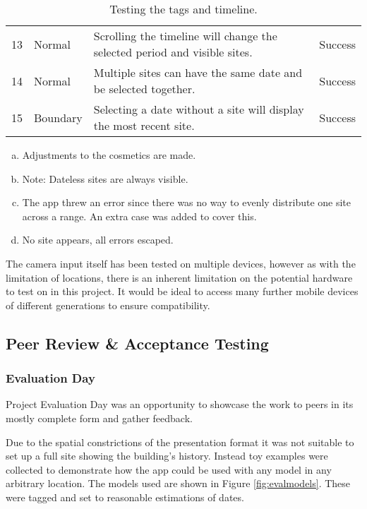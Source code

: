 \documentclass{article}
\begin{document}
\begin{table}[H]
\begin{tabular}{llll}
13         & Normal        & Scrolling the timeline will change the selected period and visible sites.  & Success                               \\
14         & Normal        & Multiple sites can have the same date and be selected together.            & Success                               \\
15         & Boundary      & Selecting a date without a site will display the most recent site.         & Success                              
\end{tabular}
\caption{Testing the tags and timeline.}
\end{table}
\begin{enumerate}[(a)]
    \item Adjustments to the cosmetics are made.
    \item Note: Dateless sites are always visible.
    \item The app threw an error since there was no way to evenly distribute one site across a range. An extra case was added to cover this.
    \item No site appears, all errors escaped.
\end{enumerate}

The camera input itself has been tested on multiple devices, however as with the limitation of locations, there is an inherent limitation on the potential hardware to test on in this project. It would be ideal to access many further mobile devices of different generations to ensure compatibility.

\subsection{Peer Review \& Acceptance Testing}

\subsubsection{Evaluation Day}
Project Evaluation Day was an opportunity to showcase the work to peers in its mostly complete form and gather feedback. 

Due to the spatial constrictions of the presentation format it was not suitable to set up a full site showing the building's history. Instead toy examples were collected to demonstrate how the app could be used with any model in any arbitrary location. The models used are shown in Figure \ref{fig:evalmodels}. These were tagged and set to reasonable estimations of dates. 
\end{document}
